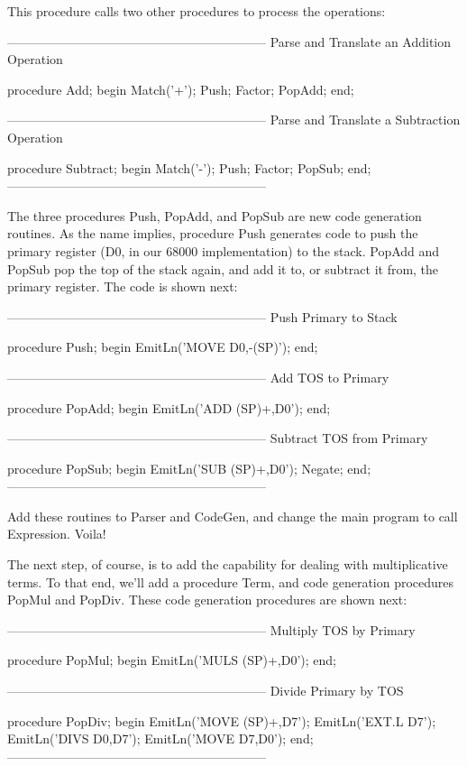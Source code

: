 \documentclass[float=false, crop=false]{standalone}
\begin{document}
This procedure calls two other procedures to process the operations:

\begin{code}
{--------------------------------------------------------------}
{ Parse and Translate an Addition Operation }

procedure Add;
begin
	Match('+');
	Push;
	Factor;
	PopAdd;
end;


{--------------------------------------------------------------}
{ Parse and Translate a Subtraction Operation }

procedure Subtract;
begin
	Match('-');
	Push;
	Factor;
	PopSub;
end;
{--------------------------------------------------------------}
\end{code}

The three procedures Push, PopAdd, and PopSub are new code generation routines.
As the name implies, procedure Push generates code to push the primary register
(D0, in our 68000 implementation) to the stack. PopAdd and PopSub pop the top of
the stack again, and add it to, or subtract it from, the primary register. The
code is shown next:


\begin{code}
{--------------------------------------------------------------}
{ Push Primary to Stack }

procedure Push;
begin
	EmitLn('MOVE D0,-(SP)');
end;

{--------------------------------------------------------------}
{ Add TOS to Primary }

procedure PopAdd;
begin
	EmitLn('ADD (SP)+,D0');
end;

{--------------------------------------------------------------}
{ Subtract TOS from Primary }

procedure PopSub;
begin
	EmitLn('SUB (SP)+,D0');
	Negate;
end;
{--------------------------------------------------------------}
\end{code}

Add these routines to Parser and CodeGen, and change the main program to call
Expression. Voila!

The next step, of course, is to add the capability for dealing with
multiplicative terms. To that end, we'll add a procedure Term, and code
generation procedures PopMul and PopDiv. These code generation procedures are
shown next:

\begin{code}
{--------------------------------------------------------------}
{ Multiply TOS by Primary }

procedure PopMul;
begin
	EmitLn('MULS (SP)+,D0');
end;

{--------------------------------------------------------------}
{ Divide Primary by TOS }

procedure PopDiv;
begin
	EmitLn('MOVE (SP)+,D7');
	EmitLn('EXT.L D7');
	EmitLn('DIVS D0,D7');
	EmitLn('MOVE D7,D0');
end;
{--------------------------------------------------------------}
\end{code}
\end{document}
